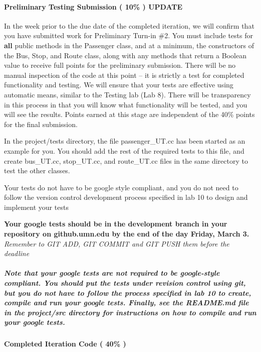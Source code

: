 \paragraph*{Preliminary Testing Submission ( 10\% ) {\bfseries U\+P\+D\+A\+TE}}

In the week prior to the due date of the completed iteration, we will confirm that you have submitted work for Preliminary Turn-\/in \#2. You must include tests for {\bfseries all} public methods in the Passenger class, and at a minimum, the constructors of the Bus, Stop, and Route class, along with any methods that return a Boolean value to receive full points for the preliminary submission. There will be no manual inspection of the code at this point -- it is strictly a test for completed functionality and testing. We will ensure that your tests are effective using automatic means, similar to the Testing lab (Lab 8). There will be transparency in this process in that you will know what functionality will be tested, and you will see the results. Points earned at this stage are independent of the 40\% points for the final submission.

In the {\ttfamily project/tests} directory, the file {\ttfamily passenger\+\_\+\+U\+T.\+cc} has been started as an example for you. You should add the rest of the required tests to this file, and create {\ttfamily bus\+\_\+\+U\+T.\+cc}, {\ttfamily stop\+\_\+\+U\+T.\+cc}, and {\ttfamily route\+\_\+\+U\+T.\+cc} files in the same directory to test the other classes.

Your tests do not have to be google style compliant, and you do not need to follow the version control development process specified in lab 10 to design and implement your tests

{\bfseries Your google tests should be in the development branch in your repository on github.\+umn.\+edu by the end of the day Friday, March 3.} {\itshape Remember to G\+IT A\+DD, G\+IT C\+O\+M\+M\+IT and G\+IT P\+U\+SH them before the deadline}

\subparagraph*{Note that your google tests are not required to be google-\/style compliant. You should put the tests under revision control using git, but you do not have to follow the process specified in lab 10 to create, compile and run your google tests. Finally, see the R\+E\+A\+D\+M\+E.\+md file in the {\ttfamily project/src} directory for instructions on how to compile and run your google tests.}

\paragraph*{Completed Iteration Code ( 40\% )}

